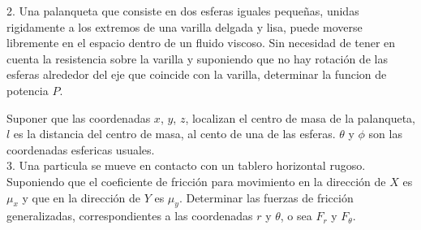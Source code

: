 \documentclass[letter,11pt]{article}
\begin{document}
2. Una palanqueta que consiste en dos esferas iguales pequeñas, unidas
rigidamente a los extremos de una varilla delgada y lisa, puede moverse
libremente en el espacio dentro de un fluido viscoso. Sin necesidad de tener en
cuenta la resistencia sobre la varilla y suponiendo que no hay rotación de las
esferas alrededor del eje que coincide con la varilla, determinar la funcion de
potencia $P$.

Suponer que las coordenadas $x$, $y$, $z$, localizan el centro de masa de la
palanqueta, $l$ es la distancia del centro de masa, al cento de una de las
esferas. $\theta$ y $\phi$ son las coordenadas esfericas usuales.
\\

3. Una particula se mueve en contacto con un tablero horizontal rugoso.
Suponiendo que el coeficiente de fricción para movimiento en la dirección de
$X$ es $\mu_x$ y que en la dirección de $Y$ es $\mu_y$. Determinar las fuerzas
de fricción generalizadas, correspondientes a las coordenadas $r$ y $\theta$,
o sea $F_r$ y $F_{\theta}$.
\end{document}
